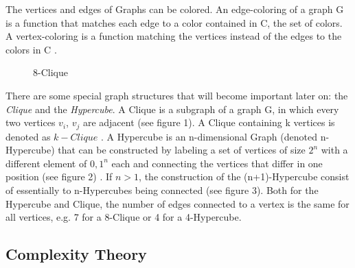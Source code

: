 \documentclass[12pt,a4paper]{article}
\begin{document}
The vertices and edges of Graphs can be colored. An edge-coloring of a graph G is a function that matches each edge to a color contained in C, the set of colors.  A vertex-coloring is a function matching the vertices instead of the edges to the colors in C \citep[pp. 7-8]{Gross2013}. 
\newpage
\begin{wrapfigure}{r}{4cm}
	
	\caption{8-Clique}
\end{wrapfigure}
\par There are some special graph structures that will become important later on: the \textit{Clique} and the \textit{Hypercube}. A Clique is a subgraph of a graph G, in which every two vertices $v_i$, $v_j$ are adjacent (see figure 1).  A Clique containing k vertices is denoted as $k-Clique$ \citep[pp. 21, 111]{Gross2013}.
\newline
\newline
A Hypercube is an n-dimensional Graph (denoted n-Hypercube) that can be constructed by labeling a set of vertices of size $2^n$ with a different element of ${0, 1}^n$ each and connecting the vertices that differ in one position (see figure 2) \citep[p. 60]{Bollobas1998}. If $n > 1$, the construction of the (n+1)-Hypercube consist of essentially to n-Hypercubes being connected (see figure 3). Both for the Hypercube and Clique, the number of edges connected to a vertex is the same for all vertices, e.g. 7 for a 8-Clique or 4 for a 4-Hypercube.
\newline

\par
\begin{figure}[h]
\begin{minipage}{.3\textwidth}
	
\end{minipage}
\begin{minipage}{.5\textwidth}
	
	\centering
	 	
\end{minipage}
\end{figure}

\newpage
\subsection{Complexity Theory}
\end{document}
